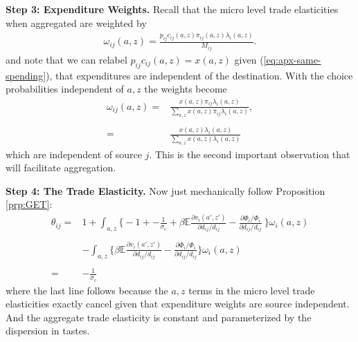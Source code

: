 \documentclass[12pt,pdftex]{article}
\begin{document}
\begin{onehalfspacing}
\textbf{Step 3: Expenditure Weights.} Recall that the micro level trade elasticities when aggregated are weighted by
\begin{align}
\omega_{ij}(a,z) = \frac{p_{ij}c_{ij}(a,z)\pi_{ij}(a,z) \lambda_{i}(a,z)}{M_{ij}}.
\end{align}
and note that we can relabel $p_{ij}c_{ij}(a,z) = x(a,z)$ given (\ref{eq:apx-same-spending}), that expenditures are independent of the destination. With the choice probabilities independent of $a,z$ the weights become
\begin{align}
\omega_{ij}(a,z) =& \frac{x(a,z)\pi_{ij} \lambda_{i}(a,z)}{\sum_{a,z}x(a,z)\pi_{ij} \lambda_{i}(a,z)}, \\
\nonumber \\
=& \frac{x(a,z) \lambda_{i}(a,z)}{\sum_{a,z} x(a,z) \lambda_{i}(a,z)}
\end{align}
which are independent of source $j$. This is the second important observation that will facilitate aggregation.

\textbf{Step 4: The Trade Elasticity.} Now just mechanically follow Proposition \ref{prp:GET}:
\begin{align}
\nonumber
\theta_{ij} =& 1 + \int_{a,z} \bigg \{ -1 +  -\frac{1}{\sigma_{\epsilon}} + \beta \mathbb{E} \frac{\partial v_{i}(a',z')}{\partial d_{ij}/d_{ij}} -  \frac{\partial \Phi_{i} / \Phi_{i}}{\partial d_{ij}/d_{ij}} \  \bigg \}\omega_{i}(a,z) \\
\nonumber \\
& - \int_{a,z} \bigg \{   \beta \mathbb{E} \frac{\partial v_{i}(a',z')}{\partial d_{ij}/d_{ij}} -  \frac{\partial \Phi_{i} / \Phi_{i}}{\partial d_{ij}/d_{ij}}  \bigg \}\omega_{i}(a,z) \\
\nonumber \\
= & -\frac{1}{\sigma_{\epsilon}} \nonumber
\end{align}
where the last line follows because the $a,z$ terms in the micro level trade elasticities exactly cancel given that expenditure weights are source independent. And the aggregate trade elasticity is constant and parameterized by the dispersion in tastes.


\end{onehalfspacing}
\end{document}
